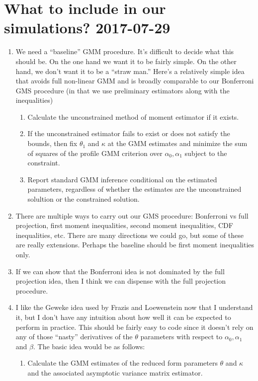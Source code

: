 \documentclass[12pt]{article}
\begin{document}
\section{What to include in our simulations? 2017-07-29}
\begin{enumerate}
  \item We need a ``baseline'' GMM procedure. It's difficult to decide what this should be. On the one hand we want it to be fairly simple. On the other hand, we don't want it to be a ``straw man.''
    Here's a relatively simple idea that avoids full non-linear GMM and is broadly comparable to our Bonferroni GMS procedure (in that we use preliminary estimators along with the inequalities)
    \begin{enumerate}
      \item Calculate the unconstrained method of moment estimator if it exists.
      \item If the unconstrained estimator fails to exist or does not satisfy the bounds, then fix $\theta_1$ and $\kappa$ at the GMM estimates and minimize the sum of squares of the profile GMM criterion over $\alpha_0, \alpha_1$ subject to the constraint.
      \item Report standard GMM inference conditional on the estimated parameters, regardless of whether the estimates are the unconstrained solultion or the constrained solution.
    \end{enumerate}
  \item There are multiple ways to carry out our GMS procedure: Bonferroni vs full projection, first moment inequalities, second moment inequalities, CDF inequalities, etc.
    There are many directions we could go, but some of these are really extensions.
    Perhaps the baseline should be first moment inequalities only.
  \item If we can show that the Bonferroni idea is not dominated by the full projection idea, then I think we can dispense with the full projection procedure.
  \item I like the Geweke idea used by Frazis and Loewenstein now that I understand it, but I don't have any intuition about how well it can be expected to perform in practice.
    This should be fairly easy to code since it doesn't rely on any of those ``nasty'' derivatives of the $\theta$ parameters with respect to $\alpha_0, \alpha_1$ and $\beta$.
    The basic idea would be as follows:
    \begin{enumerate}
      \item Calculate the GMM estimates of the reduced form parameters $\theta$ and $\kappa$ and the associated asymptotic variance matrix estimator. 

\end{enumerate}
\end{enumerate}
\end{document}
